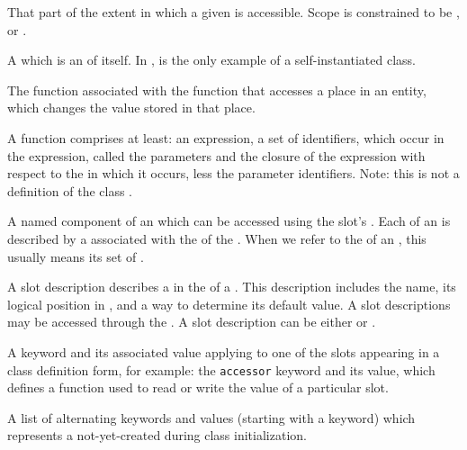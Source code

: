 \begin{optDefinition}
\begin{definitions}
     That part of the extent in which a
    given  is accessible.  Scope is constrained to be ,
     or .

       A  which is
    an  of itself.  In \eulisp,  is the only
    example of a self-instantiated class.

     The function
    associated with the function that accesses a place in an entity, which
    changes the value stored in that place.

     A function
    comprises at least: an expression, a set of identifiers, which occur in the
    expression, called the parameters and the closure of the expression with
    respect to the  in which it occurs, less the
    parameter identifiers.  Note: this is not a definition of the class
    .

      A named component of an
     which can be accessed using the slot's .  Each
     of an  is described by a 
    associated with the  of the .  When we refer to the
     of an , this usually means its set of
    .

      A slot
    description describes a  in the  of a .
    This description includes the  name, its logical position in
    , and a way to determine its default value.  A 
    slot descriptions may be accessed through the 
    .  A slot description can be either
     or .

      A keyword and its
    associated value applying to one of the slots appearing in a class
    definition form, for example: the {\tt accessor} keyword and its
    value, which defines a function used to read or write the value of a
    particular slot.

      A list
    of alternating keywords and values (starting with a keyword) which
    represents a not-yet-created   during class
    initialization.


\end{definitions}
\end{optDefinition}
